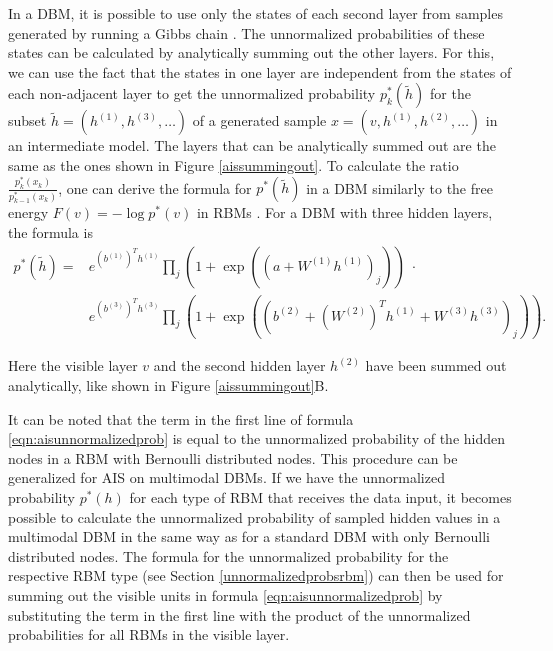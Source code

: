 \documentclass[12pt]{article}
\begin{document}
In a DBM, it is possible to use only the states of each second layer from samples generated by running a Gibbs chain \citep{salakhutdinov2008learning}. The unnormalized probabilities of these states can be calculated by analytically summing out the other layers.
For this, we can use the fact that the states in one layer are independent from the states of each non-adjacent layer to get the unnormalized probability $p_k^*(\tilde{h})$ for the subset $\tilde{h} = \left(h^{(1)}, h^{(3)}, \dots\right)$ of a generated sample $x = \left( v, h^{(1)}, h^{(2)}, \dots \right)$ in an intermediate model.
The layers that can be analytically summed out are the same as the ones shown in Figure \ref{aissummingout}.
To calculate the ratio $\frac{p_k^*(x_k)}{p_{k-1}^*(x_{k})}$, one can derive the formula for $p^*(\tilde{h})$ in a DBM similarly to the free energy $F(v) = - \log p^*(v)$ in RBMs \citep{sala2012anefficient}. For a DBM with three hidden layers, the formula is
\begin{align}
p^*( \tilde{h} ) =&  e^{(b^{(1)})^T h^{(1)}} \prod_j (1+ \exp((a + W^{(1)} h^{(1)})_j)) \; \cdot \nonumber \\
&e^{(b^{(3)})^T h^{(3)}} \prod_{j}  \left( 1 + \exp \left( (b^{(2)} + (W^{(2)})^T h^{(1)} + W^{(3)} h^{(3)})_j \right) \right).
\label{eqn:aisunnormalizedprob}
\end{align}

Here the visible layer $v$ and the second hidden layer $h^{(2)}$ have been summed out analytically, like shown in Figure \ref{aissummingout}B.



It can be noted that the term in the first line of formula \ref{eqn:aisunnormalizedprob} is equal to the unnormalized probability of the hidden nodes in a RBM with Bernoulli distributed nodes.
This procedure can be generalized for AIS on multimodal DBMs.
If we have the unnormalized probability $p^*(h)$ for each type of RBM that receives the data input, it becomes possible to calculate the unnormalized probability of sampled hidden values in a multimodal DBM in the same way as for a standard DBM with only Bernoulli distributed nodes.
The formula for the unnormalized probability for the respective RBM type (see Section \ref{unnormalizedprobsrbm}) can then be used for summing out the visible units in formula \ref{eqn:aisunnormalizedprob} by substituting the term in the first line with the product of the unnormalized probabilities for all RBMs in the visible layer.
\end{document}
